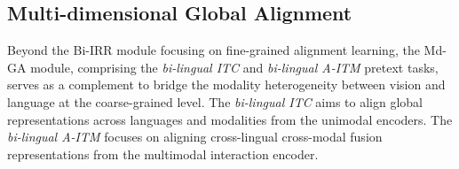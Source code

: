 \documentclass[10pt,journal,compsoc]{IEEEtran}
\begin{document}

\subsection{Multi-dimensional Global Alignment}
Beyond the Bi-IRR module focusing on fine-grained alignment learning, the Md-GA module, comprising the \emph{bi-lingual ITC} and \emph{bi-lingual A-ITM} pretext tasks, serves as a complement to bridge the modality heterogeneity between vision and language at the coarse-grained level.
The \emph{bi-lingual ITC} aims to align global representations across languages and modalities from the unimodal encoders.
The \emph{bi-lingual A-ITM} focuses on aligning cross-lingual cross-modal fusion representations from the multimodal interaction encoder.
\end{document}
